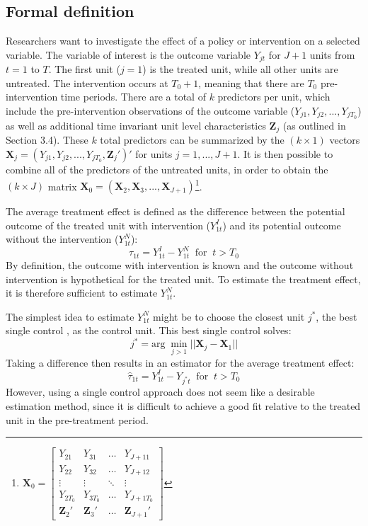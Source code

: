 \documentclass{scrbook}
\begin{document}
\subsection*{Formal definition}

Researchers want to investigate the effect of a policy or intervention
on a selected variable. The variable of interest is the outcome variable
\(Y_{jt}\) for \(J + 1\) units from \(t=1\) to \(T\). The first unit
(\(j = 1\)) is the treated unit, while all other units are untreated.
The intervention occurs at \(T_{0}+1\), meaning that there are \(T_{0}\)
pre-intervention time periods. There are a total of \(k\) predictors per
unit, which include the pre-intervention observations of the outcome
variable (\(Y_{j1},Y_{j2},...,Y_{jT_{0}}\)) as well as additional time
invariant unit level characteristics \(\mathbf{Z}_{j}\) (as outlined in
Section 3.4). These \(k\) total predictors can be summarized by the
\((k\times 1)\) vectors
\(\mathbf{X}_{j}=(Y_{j1},Y_{j2},...,Y_{jT_{0}},\mathbf{Z}_{j}')'\) for
units \(j=1,...,J + 1\). It is then possible to combine all of the
predictors of the untreated units, in order to obtain the
\((k\times J)\) matrix
\(\mathbf{X}_{0}=(\mathbf{X}_{2},\mathbf{X}_{3},...,\mathbf{X}_{J + 1})\)\footnote{\(\mathbf{X}_0=
\begin{bmatrix}
Y_{21} & Y_{31} & \dots & Y_{J+11}\\
Y_{22} & Y_{32} & \dots & Y_{J+12}\\
\vdots & \vdots & \ddots & \vdots\\
Y_{2T_{0}} & Y_{3T_{0}} & \dots & Y_{J+1T_{0}}\\
\mathbf{Z}_{2}' & \mathbf{Z}_{3}' & \dots & \mathbf{Z}_{J + 1}'
\end{bmatrix}\)}.

The average treatment effect is defined as the difference between the
potential outcome of the treated unit with intervention (\(Y_{1t}^{I}\))
and its potential outcome without the intervention (\(Y_{1t}^{N}\)):
\begin{equation}
\tau_{1t}=Y_{1t}^{I}-Y_{1t}^{N}\; \; \text{for}\; \; t>T_{0}
\end{equation} By definition, the outcome with intervention is known and
the outcome without intervention is hypothetical for the treated unit.
To estimate the treatment effect, it is therefore sufficient to estimate
\(Y_{1t}^{N}\).

The simplest idea to estimate \(Y_{1t}^{N}\) might be to choose the
closest unit \(j^{*}\), the best single control
\parencite{doudchenko_balancing_2016}, as the control unit. This best
single control solves: \begin{equation}
j^{*}=\text{arg}\; \min_{j>1}\vert\vert\mathbf{X}_{j}-\mathbf{X}_{1}\vert\vert
\end{equation} Taking a difference then results in an estimator for the
average treatment effect: \begin{equation}
\hat{\tau}_{1t}=Y_{1t}^{I}-Y_{j^{*}t}\; \; \text{for}\; \; t>T_{0}
\end{equation} However, using a single control approach does not seem
like a desirable estimation method, since it is difficult to achieve a
good fit relative to the treated unit in the pre-treatment period.
\end{document}
